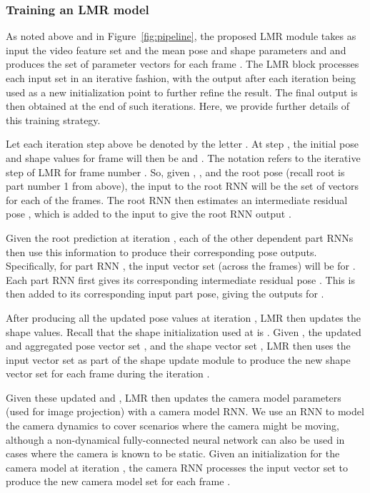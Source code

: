 \documentclass[10pt,twocolumn,letterpaper]{article}
\begin{document}
\subsubsection{Training an LMR model} 
As noted above and in Figure~\ref{fig:pipeline}, the proposed LMR module takes as input the video feature set  and the mean pose and shape parameters  and  and produces the set of parameter vectors  for each frame . The LMR block processes each input set in an iterative fashion, with the output after each iteration being used as a new initialization point to further refine the result. The final output  is then obtained at the end of  such iterations. Here, we provide further details of this training strategy. 

Let each iteration step above be denoted by the letter . At step , the initial pose and shape values for frame  will then be  and . The  notation refers to the  iterative step of LMR for frame number . So, given , , and the root pose  (recall root is part number 1 from above), the input to the root RNN will be the set of  vectors  for each of the  frames. The root RNN then estimates an intermediate residual pose , which is added to the input  to give the root RNN output .

Given the root prediction  at iteration , each of the other dependent part RNNs then use this information to produce their corresponding pose outputs. Specifically, for part RNN , the input vector set (across the  frames) will be  for . Each part RNN first gives its corresponding intermediate residual pose . This is then added to its corresponding input part pose, giving the outputs  for . 

After producing all the updated pose values at iteration , LMR then updates the shape values. Recall that the shape initialization used at  is . Given , the updated and aggregated pose vector set , and the shape vector set , LMR then uses the input vector set  as part of the shape update module to produce the new shape vector set  for each frame  during the iteration . 

Given these updated  and , LMR then updates the camera model parameters (used for image projection) with a camera model RNN. We use an RNN to model the camera dynamics to cover scenarios where the camera might be moving, although a non-dynamical fully-connected neural network can also be used in cases where the camera is known to be static. Given an initialization for the camera model  at iteration , the camera RNN processes the input vector set  to produce the new camera model set  for each frame .
\end{document}
